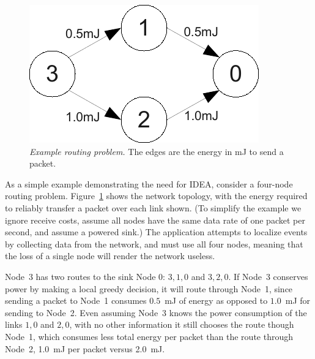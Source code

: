 \begin{figure}[t]
\begin{center}
\includegraphics[width=0.9\hsize]{./figs/MotivationExample.pdf}
\end{center}

\caption{\textit{Example routing problem.} The edges are the energy in
mJ to send a packet.}

\label{fig-motivationexample}
\end{figure}

As a simple example demonstrating the need for IDEA, consider a four-node
routing problem. Figure~\ref{fig-motivationexample} shows the network
topology, with the energy required to reliably transfer a packet over each
link shown. (To simplify the example we ignore receive costs, assume all
nodes have the same data rate of one packet per second, and assume a powered
sink.) The application attempts to localize events by collecting data from
the network, and must use all four nodes, meaning that the loss of a single
node will render the network useless.

Node~3 has two routes to the sink Node 0: $3,1,0$ and $3,2,0$. If Node~3
conserves power by making a local greedy decision, it will route through
Node~1, since sending a packet to Node~1 consumes $0.5$~mJ of energy as
opposed to $1.0$~mJ for sending to Node~2. Even assuming Node~3 knows the
power consumption of the links $1,0$ and $2,0$, with no other information it
still chooses the route though Node~1, which consumes less total energy per
packet than the route through Node~2, 1.0~mJ per packet versus 2.0~mJ.

\vfill\eject

